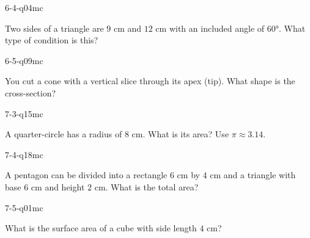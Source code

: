 \begin{practiceQuestion}{6-4-q04}{mc}
\begin{questionText}
Two sides of a triangle are $9$ cm and $12$ cm with an included angle of $60°$. What type of condition is this?
\end{questionText}
\end{practiceQuestion}

\begin{practiceQuestion}{6-5-q09}{mc}
\begin{questionText}
You cut a cone with a vertical slice through its apex (tip). What shape is the cross-section?
\end{questionText}
\end{practiceQuestion}

\begin{practiceQuestion}{7-3-q15}{mc}
\begin{questionText}
A quarter-circle has a radius of $8$ cm. What is its area? Use $\pi \approx 3.14$.
\end{questionText}
\end{practiceQuestion}

\begin{practiceQuestion}{7-4-q18}{mc}
\begin{questionText}
A pentagon can be divided into a rectangle $6$ cm by $4$ cm and a triangle with base $6$ cm and height $2$ cm. What is the total area?
\end{questionText}
\end{practiceQuestion}

\begin{practiceQuestion}{7-5-q01}{mc}
\begin{questionText}
What is the surface area of a cube with side length $4$ cm?
\end{questionText}
\end{practiceQuestion}

